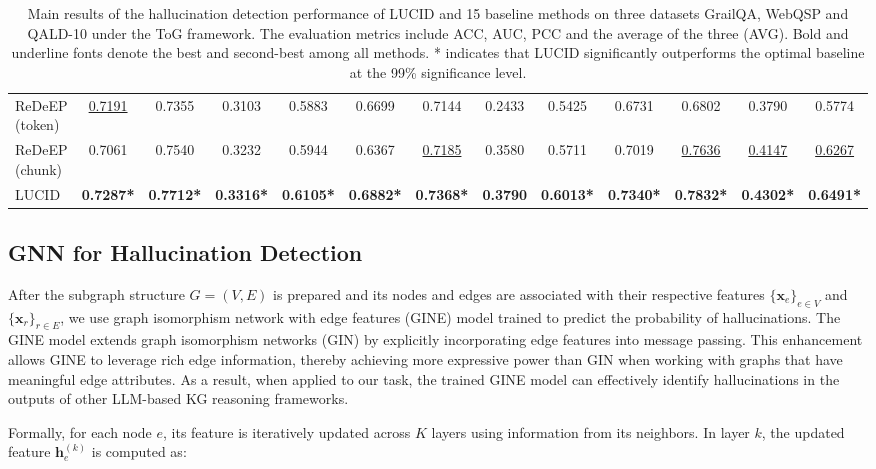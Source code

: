 \documentclass[11pt]{article}
\begin{document}
\begin{table}[t]
{\begin{tabular}{l | c c c c | c c c c | c c c c}
ReDeEP (token) & \underline{0.7191} & 0.7355 & 0.3103 & 0.5883 & 0.6699 & 0.7144 & 0.2433 & 0.5425 & 0.6731 & 0.6802 & 0.3790 & 0.5774 \\
ReDeEP (chunk) & 0.7061 & 0.7540 & 0.3232 & 0.5944 & 0.6367 & \underline{0.7185} & 0.3580 & 0.5711 & 0.7019 & \underline{0.7636} & \underline{0.4147} & \underline{0.6267} \\
\hline
LUCID & \textbf{0.7287*} & \textbf{0.7712*} & \textbf{0.3316*} & \textbf{0.6105*} & \textbf{0.6882*} & \textbf{0.7368*} & \textbf{0.3790} & \textbf{0.6013*} & \textbf{0.7340*} & \textbf{0.7832*} & \textbf{0.4302*} & \textbf{0.6491*} \\
\hline
\end{tabular}
}
\caption{\label{tab:main-ToG}
Main results of the hallucination detection performance of LUCID and 15 baseline methods on three datasets GrailQA, WebQSP and QALD-10 under the ToG framework. The evaluation metrics include ACC, AUC, PCC and the average of the three (AVG). Bold and underline fonts denote the best and second-best among all methods. * indicates that LUCID significantly outperforms the optimal baseline at the 99\% significance level.
}
\end{table}

\subsection{GNN for Hallucination Detection}

After the subgraph structure $G = (V, E)$ is prepared and its nodes and edges are associated with their respective features $\{\mathbf{x}_e\}_{e \in V}$ and $\{\mathbf{x}_r\}_{r \in E}$, we use graph isomorphism network with edge features (GINE) \cite{hu2019strategies} model trained to predict the probability of hallucinations. The GINE model extends graph isomorphism networks (GIN) \cite{xu2018how} by explicitly incorporating edge features into message passing. This enhancement allows GINE to leverage rich edge information, thereby achieving more expressive power than GIN when working with graphs that have meaningful edge attributes. As a result, when applied to our task, the trained GINE model can effectively identify hallucinations in the outputs of other LLM-based KG reasoning frameworks.

Formally, for each node $e$, its feature is iteratively updated across $K$ layers using information from its neighbors. In layer $k$, the updated feature $\mathbf{h}_e^{(k)}$ is computed as: 
\end{document}
